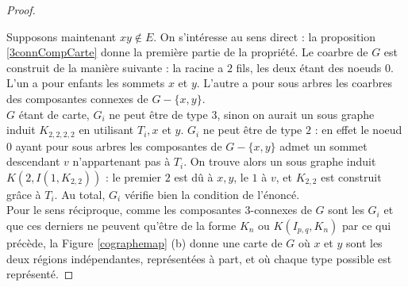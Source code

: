 \documentclass{scrartcl}
\begin{document}
\begin{flushleft}
\begin{proof}
\begin{figure}[h]
\begin{center}
        \end{center}
    \end{figure}

    Supposons maintenant $xy \notin E$. On s'intéresse au sens direct : la proposition \ref{3connCompCarte} donne la première partie de la propriété.
    Le coarbre de $G$ est construit de la manière suivante : la racine a $2$ fils, les deux étant des noeuds $0$. L'un a pour enfants les sommets $x$
    et $y$. L'autre a pour sous arbres les coarbres des composantes connexes de $G - \{x,y\}$.\\
    $G$ étant de carte, $G_i$ ne peut être de type $3$, sinon on aurait un sous graphe induit $K_{2,2,2,2}$ en utilisant $T_i, x$ et $y$.
    $G_i$ ne peut être de type $2$ : en effet le noeud $0$ ayant pour sous arbres les composantes de $G - \{x,y\}$ admet un sommet descendant
    $v$ n'appartenant pas à $T_i$. On trouve alors un sous graphe induit $K(2, I(1, K_{2,2}))$ : le premier $2$ est dû à $x,y$, le $1$ à $v$,
    et $K_{2,2}$ est construit grâce à $T_i$. Au total, $G_i$ vérifie bien la condition de l'énoncé.\\
    Pour le sens réciproque, comme les composantes $3$-connexes de $G$ sont les $G_i$ et que ces derniers ne peuvent qu'être de la forme
    $K_n$ ou $K(I_{p,q}, K_n)$ par ce qui précède, la Figure \ref{cographemap} (b) donne une carte de $G$ où $x$ et $y$ sont les deux régions indépendantes,
    représentées à part, et où chaque type possible est représenté.
\end{proof}


\end{flushleft}
\end{document}
